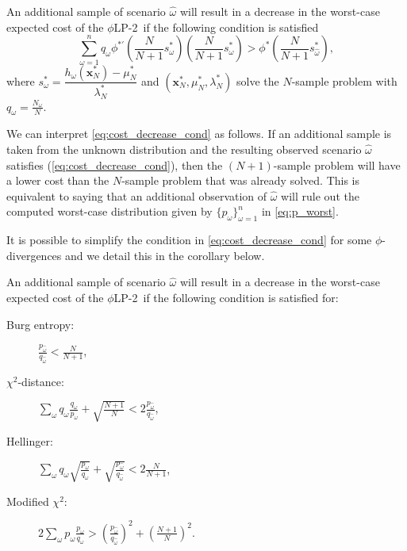 \documentclass[ijoc,letterpaper]{informs3} %
\newcommand{\x}{\mathbf{x}}
\newcommand{\plp}{$\phi$LP-2}
\begin{document}
\begin{theorem}
	\label{thm:value}
	An additional sample of scenario $\hat{\omega}$ will result in a decrease in the worst-case expected cost of the \plp\ if the following condition is satisfied
	\begin{equation} \label{eq:cost_decrease_cond}
		\sum_{\omega=1}^n q_\omega \phi^{*\prime}\left(\frac{N}{N+1}s^*_\omega\right) \left(\frac{N}{N+1}s^*_\omega\right) > \phi^*\left(\frac{N}{N+1}s^*_{\hat{\omega}}\right),
	\end{equation}
	where $s^*_\omega = \dfrac{h_\omega(\x^*_N) - \mu^*_N}{\lambda^*_N}$ and $(\x^*_N,\mu^*_N,\lambda^*_N)$ solve the $N$-sample problem with $q_\omega = \tfrac{N_\omega}{N}$.
\end{theorem}

We can interpret \eqref{eq:cost_decrease_cond} as follows. If an additional sample is taken from the unknown distribution and the resulting observed scenario $\hat{\omega}$ satisfies (\ref{eq:cost_decrease_cond}), then the $(N+1)$-sample problem will have a lower cost than the $N$-sample problem that was already solved.
This is equivalent to saying that an additional observation of $\hat{\omega}$ will rule out the computed worst-case distribution given by $\{p_\omega\}_{\omega=1}^{n}$ in \eqref{eq:p_worst}.

It is possible to simplify the condition in \eqref{eq:cost_decrease_cond} for some $\phi$-divergences and we detail this in the corollary below. 

\begin{corollary}
	\label{cor:cost_decrease_trick}
	An additional sample of scenario $\hat{\omega}$ will result in a decrease in the worst-case expected cost of the \plp\ if the following condition is satisfied for:\vspace*{-0.1in}
	\begin{multicols}{2}
		\begin{description}
			\item[Burg entropy:] $\frac{p_{\hat{\omega}}}{q_{\hat{\omega}}} < \frac{N}{N+1}$, %
			\item[$\chi^2$-distance:]  $\sum_\omega q_\omega \frac{q_\omega}{p_\omega} + \sqrt{\frac{N+1}{N}} < 2 \frac{p_{\hat{\omega}}}{q_{\hat{\omega}}}$,
			\item[Hellinger:] $\sum_\omega q_\omega \sqrt{\frac{p_\omega}{q_\omega}} + \sqrt{\frac{p_{\hat{\omega}}}{q_{\hat{\omega}}}} < 2 \frac{N}{N+1}$,
			\item[Modified $\chi^2$:] $2 \sum_\omega p_\omega \frac{p_\omega}{q_\omega} > \left(\frac{p_{\hat{\omega}}}{q_{\hat{\omega}}}\right)^2 + \left(\frac{N+1}{N}\right)^2$.
		\end{description}
	\end{multicols}
\end{corollary}
\end{document}
